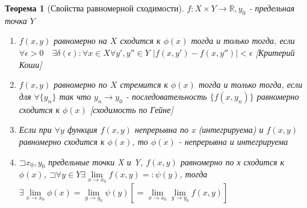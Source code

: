 \documentclass[a4paper]{article}
\newcommand\letsymbol{\mathord{\sqsupset}}
\newtheorem{theorem}{Теорема}[section]
\theoremstyle{definition}
\theoremstyle{remark}
\begin{document}
   \begin{theorem}[Свойства равномерной сходимости]
    $f:X \times Y \longrightarrow \mathbb{R}, y_0$ - предельная точка $Y$
\begin{enumerate}
    \item $f(x,y)$ равномерно на $X$ сходится к $\phi(x)$ тогда и только тогда,
     если $\forall \epsilon>0 \quad \exists \delta(\epsilon): \forall x \in X \forall y', y'' \in Y$ $|f(x, y') - f(x, y'')|<\epsilon$ [Критерий Коши]
    \item $f(x,y)$ равномерно по $X$ стремится к $\phi(x)$ тогда и только тогда, если для  $\forall\{y_n\}$ так что $y_n \longrightarrow y_0$
     - последовательность $\{f(x,y_n)\}$ равномерно сходится к $\phi(x)$ [сходимость по Гейне]
    \item Если при $\forall y$ функция $f(x,y)$ непрерывна по x (интегрируема) и $f(x,y)$ равномерно сходится к $\phi(x)$, то $\phi(x)$ -  непрерывна и интегрируема
    \item $\letsymbol x_0, y_0$ предельные точки X и Y, $f(x,y)$ равномерно по х сходится к $\phi(x)$,\hfill \break 
     $\letsymbol\forall y \in Y \exists \lim\limits_{x \to x_0}f(x,y) =: \psi(y)$, тогда $\exists \lim\limits_{x \to x_0}\phi(x) = \lim\limits_{y \to y_0}\psi(y) [= \lim\limits_{x \to x_0}\lim\limits_{y \to y_0}f(x,y)]$ 
  \end{enumerate}
\end{theorem}
\end{document}
